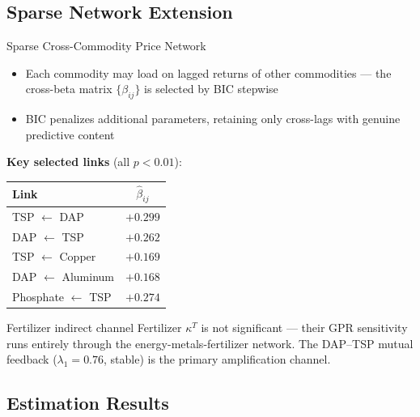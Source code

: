 ﻿\documentclass[aspectratio=1610]{beamer}
\begin{document}
\subsection{Sparse Network Extension}

\begin{frame}[shrink=10]{Sparse Cross-Commodity Price Network}

  \begin{itemize}
    \item Each commodity may load on lagged returns of other commodities ---
          the cross-beta matrix $\{\beta_{ij}\}$ is selected by BIC stepwise
    \item BIC penalizes additional parameters, retaining only cross-lags with
          genuine predictive content
  \end{itemize}

  \smallskip

  \textbf{Key selected links} (all $p < 0.01$):

  \begin{tabular}{lc}
    \toprule
    Link & $\hat{\beta}_{ij}$ \\
    \midrule
    TSP $\leftarrow$ DAP        & $+0.299$ \\
    DAP $\leftarrow$ TSP        & $+0.262$ \\
    TSP $\leftarrow$ Copper     & $+0.169$ \\
    DAP $\leftarrow$ Aluminum   & $+0.168$ \\
    Phosphate $\leftarrow$ TSP  & $+0.274$ \\
    \bottomrule
  \end{tabular}

  \smallskip

  \begin{alertblock}{Fertilizer indirect channel}
    Fertilizer $\kappa^T$ is not significant --- their GPR sensitivity runs
    entirely through the energy-metals-fertilizer network.
    The DAP--TSP mutual feedback ($\lambda_1 = 0.76$, stable) is the primary
    amplification channel.
  \end{alertblock}

\end{frame}

\subsection{Estimation Results}
\end{document}
